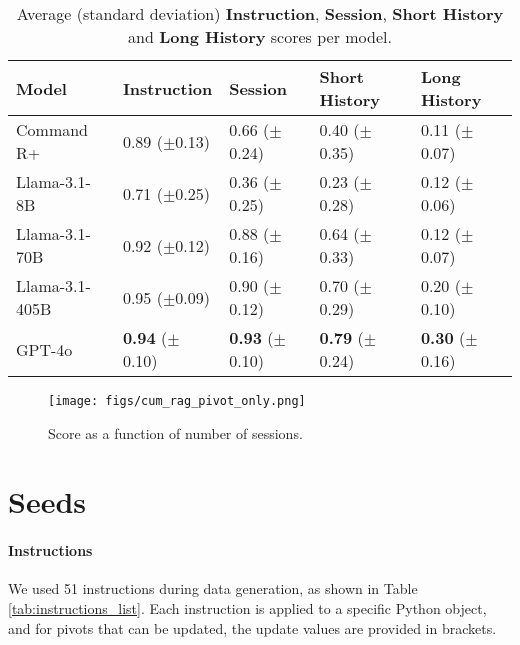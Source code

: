 \begin{table*}
    \centering
    \begin{tabular}{lllll}
        \toprule
         \textbf{Model} &  \textbf{Instruction} &  \textbf{Session} & \textbf{Short History} & \textbf{Long History} \\
         \midrule
         Command R+ &  0.89 \scriptsize{($\pm$0.13)}&  0.66 \scriptsize{($\pm$0.24)}& 0.40 \scriptsize{($\pm$0.35)}& 0.11 \scriptsize{($\pm$0.07)}\\
         
         Llama-3.1-8B &  0.71 \scriptsize{($\pm$0.25)} & 0.36 \scriptsize{($\pm$0.25)} & 0.23 \scriptsize{($\pm$0.28)}& 0.12 \scriptsize{($\pm$0.06)} \\
         
         Llama-3.1-70B &  0.92 \scriptsize{($\pm$0.12)}&  0.88 \scriptsize{($\pm$0.16)}& 0.64 \scriptsize{($\pm$0.33)}& 0.12 \scriptsize{($\pm$0.07)}\\
         
         Llama-3.1-405B &  0.95 \scriptsize{($\pm$0.09)}&  0.90 \scriptsize{($\pm$0.12)}& 0.70 \scriptsize{($\pm$0.29)}& 0.20 \scriptsize{($\pm$0.10)}\\
         
         GPT-4o &  \textbf{0.94} \scriptsize{($\pm$0.10)}&  \textbf{0.93} \scriptsize{($\pm$0.10)}& \textbf{0.79} \scriptsize{($\pm$0.24)}& \textbf{0.30} \scriptsize{($\pm$0.16)}\\
         \bottomrule
    \end{tabular}
    \caption{Average (standard deviation) \textbf{Instruction}, \textbf{Session},  \textbf{Short History} and \textbf{Long History} scores per model.}
    \label{tab:detailed_scores}
\end{table*}

\begin{figure}[t!]
    \centering
    \texttt{[image: figs/cum\_rag\_pivot\_only.png]}
    \caption{Score as a function of number of sessions. 
    }
    \label{fig:cum_rag_pivot_only}
\end{figure}

\section{Seeds}
\label{app:seeds}

\paragraph{Instructions} We used 51 instructions during data generation, as shown in Table \ref{tab:instructions_list}. Each instruction is applied to a specific Python object, and for pivots that can be updated, the update values are provided in brackets.

